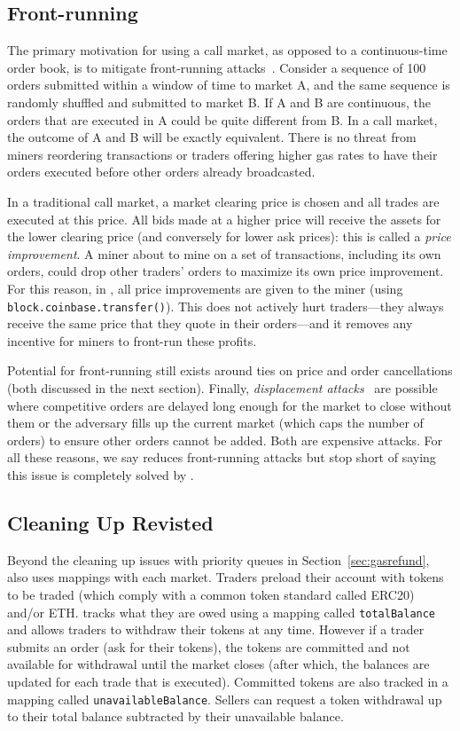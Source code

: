 \subsection{Front-running} \label{sec:front}

The primary motivation for using a call market, as opposed to a continuous-time order book, is to mitigate front-running attacks~\cite{clark2014decentralizing,eskandari2019sok,daian2019flash}. Consider a sequence of 100 orders submitted within a window of time to market A, and the same sequence is randomly shuffled and submitted to market B. If A and B are continuous, the orders that are executed in A could be quite different from B. In a call market, the outcome of A and B will be exactly equivalent. There is no threat from miners reordering transactions or traders offering higher gas rates to have their orders executed before other orders already broadcasted. 

In a traditional call market, a market clearing price is chosen and all trades are executed at this price. All bids made at a higher price will receive the assets for the lower clearing price (and conversely for lower ask prices): this is called a \textit{price improvement}. A miner about to mine on a set of transactions, including its own orders, could drop other traders' orders to maximize its own price improvement. For this reason, in \cm, all price improvements are given to the miner (using \texttt{block.coinbase.transfer()}). This does not actively hurt traders---they always receive the same price that they quote in their orders---and it removes any incentive for miners to front-run these profits. 

Potential for front-running still exists around ties on price and order cancellations (both discussed in the next section). Finally, \textit{displacement attacks}~\cite{eskandari2019sok} are possible where competitive orders are delayed long enough for the market to close without them or the adversary fills up the current market (which caps the number of orders) to ensure other orders cannot be added. Both are expensive attacks. For all these reasons, we say \cm reduces front-running attacks but stop short of saying this issue is completely solved by \cm. 

\subsection{Cleaning Up Revisted}

Beyond the cleaning up issues with priority queues in Section~\ref{sec:gasrefund}, \cm also uses mappings with each market. Traders preload their account with tokens to be traded (which comply with a common token standard called ERC20) and/or ETH. \cm tracks what they are owed using a mapping called \texttt{totalBalance} and allows traders to withdraw their tokens at any time. However if a trader submits an order (\ie ask for their tokens), the tokens are committed and not available for withdrawal until the market closes (after which, the balances are updated for each trade that is executed). Committed tokens are also tracked in a mapping called \texttt{unavailableBalance}. Sellers can request a token withdrawal up to their total balance subtracted by their unavailable balance.

